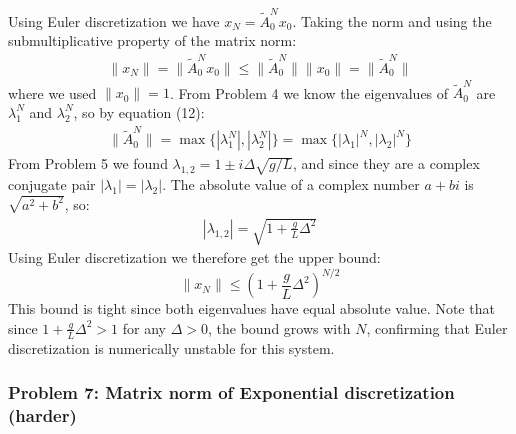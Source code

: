 \documentclass[12pt,twoside]{article}
\begin{document}
Using Euler discretization we have $x_N = \tilde{A}_0^N x_0$. Taking the norm and
using the submultiplicative property of the matrix norm:
\begin{align}
    \|x_N\| = \|\tilde{A}_0^N x_0\| \leq \|\tilde{A}_0^N\| \|x_0\| = \|\tilde{A}_0^N\|
\end{align}
where we used $\|x_0\| = 1$. From Problem 4 we know the eigenvalues of $\tilde{A}_0^N$
are $\lambda_1^N$ and $\lambda_2^N$, so by equation (12):
\begin{align}
    \|\tilde{A}_0^N\| = \max\{|\lambda_1^N|, |\lambda_2^N|\} = \max\{|\lambda_1|^N, |\lambda_2|^N\}
\end{align}
From Problem 5 we found $\lambda_{1,2} = 1 \pm i\Delta\sqrt{g/L}$, and since they are
a complex conjugate pair $|\lambda_1| = |\lambda_2|$. The absolute value of a complex
number $a + bi$ is $\sqrt{a^2 + b^2}$, so:
\begin{align}
    |\lambda_{1,2}| = \sqrt{1 + \frac{g}{L}\Delta^2}
\end{align}
Using Euler discretization we therefore get the upper bound:
$$
    \|x_N\| \leq \left(1 + \frac{g}{L}\Delta^2\right)^{N/2}
$$
This bound is tight since both eigenvalues have equal absolute value. Note that since
$1 + \frac{g}{L}\Delta^2 > 1$ for any $\Delta > 0$, the bound grows with $N$,
confirming that Euler discretization is numerically unstable for this system.

\subsubsection*{{\color{red}Problem 7: Matrix norm of Exponential discretization (harder)}}
\end{document}
